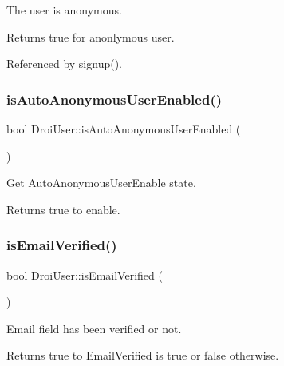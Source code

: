 The user is anonymous. \begin{DoxyReturn}{Returns}
true for anonlymous user. 
\end{DoxyReturn}


Referenced by signup().

\mbox{\label{class_droi_user_a35e4e2e972597cfc491ce2d7ee758488}} 
\subsubsection{\texorpdfstring{is\+Auto\+Anonymous\+User\+Enabled()}{isAutoAnonymousUserEnabled()}}
{\footnotesize\ttfamily bool Droi\+User\+::is\+Auto\+Anonymous\+User\+Enabled (\begin{DoxyParamCaption}{ }\end{DoxyParamCaption})\hspace{0.3cm}{\ttfamily [static]}}

Get Auto\+Anonymous\+User\+Enable state. \begin{DoxyReturn}{Returns}
true to enable. 
\end{DoxyReturn}
\mbox{\label{class_droi_user_aa45e722831198f051f635f8d9abe8da3}} 
\subsubsection{\texorpdfstring{is\+Email\+Verified()}{isEmailVerified()}}
{\footnotesize\ttfamily bool Droi\+User\+::is\+Email\+Verified (\begin{DoxyParamCaption}{ }\end{DoxyParamCaption})}

Email field has been verified or not.

\begin{DoxyReturn}{Returns}
true to Email\+Verified is true or false otherwise. 
\end{DoxyReturn}
\mbox{\label{class_droi_user_a28a2d6c0c0f07833da4584beb47ab01f}} 
